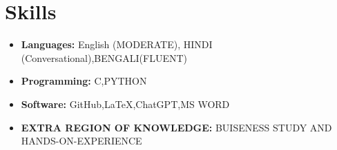 \documentclass[a4paper,10pt]{article}
\begin{document}
\vspace{1cm}

\section*{Skills}
\begin{itemize}
    \item \textbf{Languages:} English (MODERATE), HINDI (Conversational),BENGALI(FLUENT)
    \item \textbf{Programming:} C,PYTHON
    \item \textbf{Software:} GitHub,LaTeX,ChatGPT,MS WORD
    \item \textbf{EXTRA REGION OF KNOWLEDGE:} BUISENESS STUDY AND HANDS-ON-EXPERIENCE
     
\end{itemize}
\end{document}
